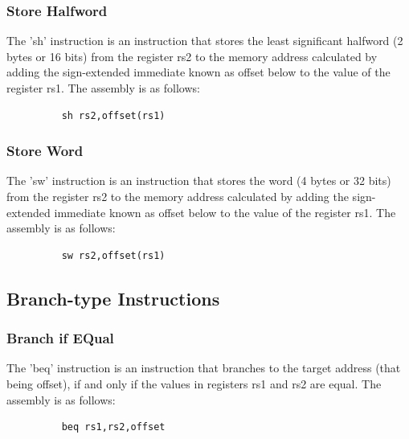 \documentclass{article}
\begin{document}
\subsubsection{Store Halfword}
\qquad
The 'sh' instruction is an instruction that stores the least significant halfword (2 bytes or 16 bits) from the register rs2 to the memory address calculated by adding the sign-extended immediate known as offset below to the value of the register rs1. The assembly is as follows:
\begin{figure}[!htbp]
    \centering
    \begin{verbatim}
    sh rs2,offset(rs1)
    \end{verbatim}
\end{figure}\newline

\subsubsection{Store Word}
\qquad
The 'sw' instruction is an instruction that stores the word (4 bytes or 32 bits) from the register rs2 to the memory address calculated by adding the sign-extended immediate known as offset below to the value of the register rs1. The assembly is as follows:
\begin{figure}[!htbp]
    \centering
    \begin{verbatim}
    sw rs2,offset(rs1)
    \end{verbatim}
\end{figure}\newline


\subsection{Branch-type Instructions}

\subsubsection{Branch if EQual}
\qquad
The 'beq' instruction is an instruction that branches to the target address (that being offset), if and only if the values in registers rs1 and rs2 are equal. The assembly is as follows:
\begin{figure}[!htbp]
    \centering
    \begin{verbatim}
    beq rs1,rs2,offset
    \end{verbatim}
\end{figure}\newline
\end{document}
